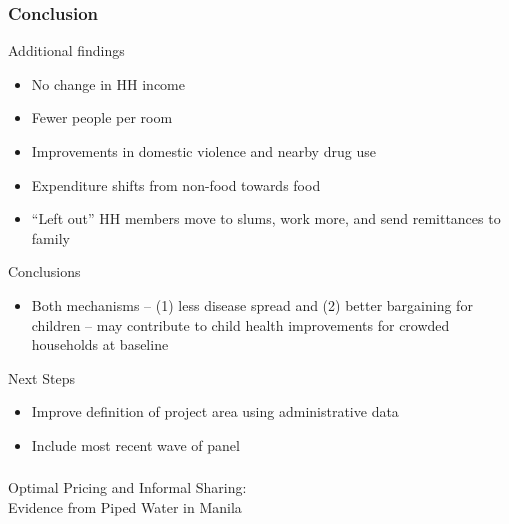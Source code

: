 \documentclass[aspectratio=149]{beamer}
\begin{document}
\begin{frame}
\frametitle{Conclusion}


Additional findings
\begin{itemize}
  \item No change in HH income
  \item Fewer people per room
  \item Improvements in domestic violence and nearby drug use
  \item Expenditure shifts from non-food towards food
  \item ``Left out'' HH members move to slums, work more, and send remittances to family
\end{itemize}
\vspace{.1cm}
Conclusions
\begin{itemize}
  \item Both mechanisms -- (1) less disease spread and (2) better bargaining for children -- may contribute to child health improvements for crowded households at baseline
\end{itemize}

\vspace{.1cm}
Next Steps
\begin{itemize}
  \item Improve definition of project area using administrative data
  \item Include most recent wave of panel
\end{itemize}

\end{frame}







\begin{frame}
\frametitle{}
\centering
{\Large \color{darkred} Optimal Pricing and Informal Sharing: \\ \vspace{.1cm} Evidence from Piped Water in Manila} 
\end{frame}

\end{document}
